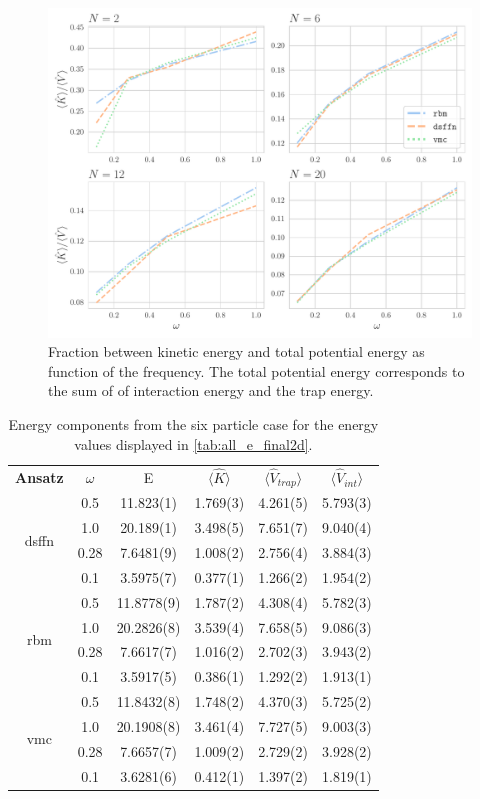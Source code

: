 \begin{figure}
    \centering
\includegraphics[width=0.8\linewidth]{Chapters/Results/dots/energy_components_vs_omega.pdf}
    \caption{Fraction between kinetic energy and total potential energy as function of the frequency. The total potential energy corresponds to the sum of of interaction energy and the trap energy.}
    \label{fig:fraction-energies}
\end{figure}

\begin{table}[H]
    \centering
\begin{tabular}{c|c|c|c|c|c}
\toprule
\multirow{2}{*}{\textbf{Ansatz}} & \multirow{2}{*}{$\omega$} & \multirow{2}{*}{E} & \multirow{2}{*}{$\langle \hat{K}\rangle$} & \multirow{2}{*}{$\langle \hat{V}_{trap}\rangle$} & \multirow{2}{*}{$\langle \hat{V}_{int}\rangle$} \\
 & & & & & \\
\midrule
\multirow{4}{*}{dsffn} & 0.5 & 11.823(1) & 1.769(3) & 4.261(5) & 5.793(3) \\
 & 1.0 & 20.189(1) & 3.498(5) & 7.651(7) & 9.040(4) \\
 & 0.28 & 7.6481(9) & 1.008(2) & 2.756(4) & 3.884(3) \\
 & 0.1 & 3.5975(7) & 0.377(1) & 1.266(2) & 1.954(2) \\
\midrule
\multirow{4}{*}{rbm} & 0.5 & 11.8778(9) & 1.787(2) & 4.308(4) & 5.782(3) \\
 & 1.0 & 20.2826(8) & 3.539(4) & 7.658(5) & 9.086(3) \\
 & 0.28 & 7.6617(7) & 1.016(2) & 2.702(3) & 3.943(2) \\
& 0.1 & 3.5917(5) & 0.386(1) & 1.292(2) & 1.913(1) \\
\midrule
\multirow{4}{*}{vmc} & 0.5 & 11.8432(8) & 1.748(2) & 4.370(3) & 5.725(2) \\
 & 1.0 & 20.1908(8) & 3.461(4) & 7.727(5) & 9.003(3) \\
 & 0.28 & 7.6657(7) & 1.009(2) & 2.729(2) & 3.928(2) \\
& 0.1 & 3.6281(6) & 0.412(1) & 1.397(2) & 1.819(1) \\
\bottomrule
\end{tabular}
\caption{Energy components from the six particle case for the energy values displayed in \ref{tab:all_e_final2d}.}
\label{tab:fraction_energies}
\end{table}

